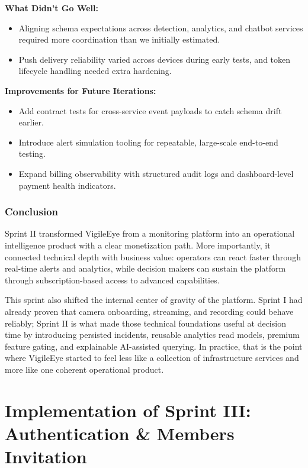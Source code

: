 \documentclass[12pt,a4paper,oneside]{report}
\begin{document}
\textbf{What Didn't Go Well:}
\begin{itemize}
  \item Aligning schema expectations across detection, analytics, and chatbot services required more coordination than we initially estimated.
  \item Push delivery reliability varied across devices during early tests, and token lifecycle handling needed extra hardening.
\end{itemize}

\textbf{Improvements for Future Iterations:}
\begin{itemize}
  \item Add contract tests for cross-service event payloads to catch schema drift earlier.
  \item Introduce alert simulation tooling for repeatable, large-scale end-to-end testing.
  \item Expand billing observability with structured audit logs and dashboard-level payment health indicators.
\end{itemize}

\subsection*{Conclusion}

\hspace{0.8cm}Sprint II transformed VigileEye from a monitoring platform into an operational intelligence product with a clear monetization path. More importantly, it connected technical depth with business value: operators can react faster through real-time alerts and analytics, while decision makers can sustain the platform through subscription-based access to advanced capabilities.

\hspace{0.8cm}This sprint also shifted the internal center of gravity of the platform. Sprint I had already proven that camera onboarding, streaming, and recording could behave reliably; Sprint II is what made those technical foundations useful at decision time by introducing persisted incidents, reusable analytics read models, premium feature gating, and explainable AI-assisted querying. In practice, that is the point where VigileEye started to feel less like a collection of infrastructure services and more like one coherent operational product.


\chapter{Implementation of Sprint III: Authentication \& Members Invitation}
\label{chap:sprint3}
\end{document}
